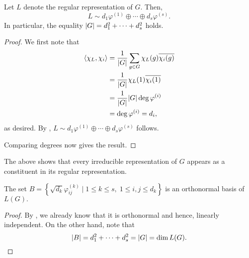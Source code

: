 \begin{prop} \label{prop:descripofL}
	Let $L$ denote the regular representation of $G.$ Then,
	\begin{equation*} 
		L \sim d_1 \varphi^{(1)} \oplus \cdots \oplus d_s \varphi^{(s)}.
	\end{equation*}
	In particular, the equality ${\left\lvert G \right\lvert} = d_1^2 + \cdots + d_s^2$ holds.
\end{prop}
\begin{proof} 
	We first note that
	\begin{align*} 
		\langle \chi_L, \chi_i\rangle &= \dfrac{1}{{\left\lvert G \right\lvert}}\sum_{g \in G} \chi_L(g)\overline{\chi_i(g)}\\
		&= \dfrac{1}{{\left\lvert G \right\lvert}}\chi_L(1)\overline{\chi_i(1)}\\
		&= \dfrac{1}{{\left\lvert G \right\lvert}}{\left\lvert G \right\lvert}\deg \varphi^{(i)}\\
		&= \deg \varphi^{(i)} = d_i,
	\end{align*}
	as desired. By , $L \sim d_1 \varphi^{(1)} \oplus \cdots \oplus d_s \varphi^{(s)}$ follows.

	Comparing degrees now gives the result.
\end{proof}

\begin{rem} \label{rem:regrepcontainsallreps}
	The above shows that every irreducible representation of $G$ appears as a constituent in its regular representation.
\end{rem}

\begin{cor} \label{cor:orthnormalbasis}
	The set $B = \left\{\sqrt{d_k}\varphi_{ij}^{(k)} \mid 1 \le k \le s,\;1 \le i, j \le d_k\right\}$ is an orthonormal basis of $L(G).$
\end{cor}
\begin{proof}
	By , we already know that it is orthonormal and hence, linearly independent. On the other hand, note that
	\begin{equation*} 
		{\left\lvert B \right\lvert} = d_1^2 + \cdots + d_s^2 = {\left\lvert G \right\lvert} = \dim L(G). \qedhere
	\end{equation*}
\end{proof}

